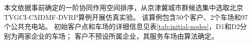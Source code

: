 \documentclass{setp-new}
\begin{document}
本文依据事前确定的一阶协同作用空间排序，从京津冀城市群候选集中选取北京TVGCI-CMDMF-DVRP算例开展仿真实验。
该算例包含50个客户、2个车场和97个公共充电站。
初始客户点和车场的详细信息见表\ref{tab:initial-nodes}，D1和D2分别为两家企业的车场；
客户不预设所属企业，其服务车场由算法确定。

\begingroup
\small
\renewcommand{\arraystretch}{0.88}
\setlength{\tabcolsep}{1.2pt}
\label{tab:initial-nodes}
\tabletail{}
\tablelasttail{\bottomrule}
\end{document}

